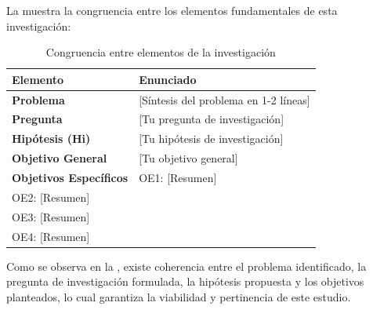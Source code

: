 
La  muestra la congruencia entre los elementos fundamentales de esta investigación:

\begin{table}[htbp]
    \centering
    \caption{Congruencia entre elementos de la investigación}
    \label{tab:congruencia}
    \small
    \begin{tabular}{@{}lp{10cm}@{}}
        \toprule
        \textbf{Elemento} & \textbf{Enunciado} \\
        \midrule
        
        \textbf{Problema} & 
        [Síntesis del problema en 1-2 líneas] \\
        
        \midrule
        
        \textbf{Pregunta} & 
        [Tu pregunta de investigación] \\
        
        \midrule
        
        \textbf{Hipótesis (Hi)} & 
        [Tu hipótesis de investigación] \\
        
        \midrule
        
        \textbf{Objetivo General} & 
        [Tu objetivo general] \\
        
        \midrule
        
        \textbf{Objetivos Específicos} & 
        OE1: [Resumen]\\
        OE2: [Resumen]\\
        OE3: [Resumen]\\
        OE4: [Resumen] \\
        
        \bottomrule
    \end{tabular}
\end{table}

Como se observa en la , existe coherencia entre el problema identificado, la pregunta de investigación formulada, la hipótesis propuesta y los objetivos planteados, lo cual garantiza la viabilidad y pertinencia de este estudio.

%
%
